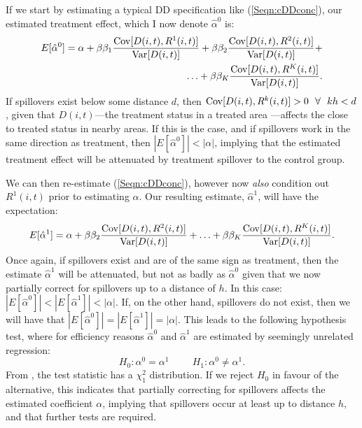 If we start by estimating a typical DD specification like (\ref{Seqn:cDDconc}),
our estimated treatment effect, which I now denote $\hat\alpha^0$ is:
\begin{equation}
\nonumber
\begin{split}
E[\hat\alpha^0]=\alpha + \beta\beta_1\frac{\mathrm{Cov}[D(i,t),R^1(i,t)]}{\mathrm{Var}[D(i,t)]}
                                + \beta\beta_2\frac{\mathrm{Cov}[D(i,t),R^2(i,t)]}{\mathrm{Var}[D(i,t)]}
                                + \\ \ldots
                                + \beta\beta_K\frac{\mathrm{Cov}[D(i,t),R^K(i,t)]}{\mathrm{Var}[D(i,t)]}.
\end{split}
\end{equation}
If spillovers exist below some distance $d$, then $\Cov[D(i,t),R^k(i,t)]>0 \ \ 
\forall \ \ kh<d$, given that $D(i,t)$---the treatment status in a treated area%
---affects the close to treated status in nearby areas. If this is the case, and 
if spillovers work in the same direction as treatment, then 
$|E[\hat\alpha^0]|<|\alpha|$, implying that the estimated treatment 
effect will be attenuated by treatment spillover to the control group.  

We can then re-estimate (\ref{Seqn:cDDconc}), however now \emph{also} condition
out $R^1(i,t)$ prior to estimating $\alpha$.  Our resulting estimate, 
$\hat\alpha^1$, will have the expectation:
\begin{equation}
\nonumber
\begin{split}
E[\hat\alpha^1]=\alpha + \beta\beta_2\frac{\mathrm{Cov}[D(i,t),R^2(i,t)]}{\mathrm{Var}[D(i,t)]}
                                + \ldots
                                + \beta\beta_K\frac{\mathrm{Cov}[D(i,t),R^K(i,t)]}{\mathrm{Var}[D(i,t)]}.
\end{split}
\end{equation}
Once again, if spillovers exist and are of the same sign as treatment, then the
estimate $\hat\alpha^1$ will be attenuated, but not as badly as $\hat\alpha^0$ 
given that we now partially correct for spillovers up to a distance of $h$.  In 
this case: $|E[\hat\alpha^0]|<|E[\hat\alpha^1]|<|\alpha|$.  If, on the other 
hand, spillovers do not exist, then we will have that 
$|E[\hat\alpha^0]|=|E[\hat\alpha^1]|=|\alpha|$.  This leads to 
the following hypothesis test, where for efficiency reasons $\hat\alpha^0$
and $\hat\alpha^1$ are estimated by seemingly unrelated regression:
\[
H_0: \alpha^0=\alpha^1 \hspace{1cm}
H_1: \alpha^0\neq\alpha^1.
\]
From \citet{Zellner1962}, the test statistic has a $\chi^2_1$ distribution. If 
we reject $H_0$ in favour of the alternative, this indicates that partially 
correcting for spillovers affects the estimated coefficient $\alpha$, implying 
that spillovers occur at least up to distance $h$, and that further tests are 
required.  


